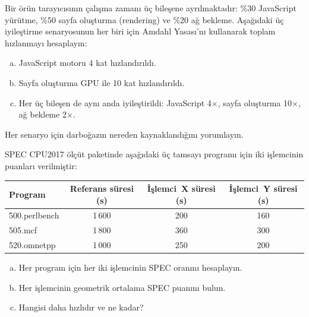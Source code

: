 \begin{alistirma}[\orta]
Bir örün tarayıcısının çalışma zamanı üç bileşene ayrılmaktadır: \%30 JavaScript yürütme, \%50 sayfa oluşturma (rendering) ve \%20 ağ bekleme. Aşağıdaki üç iyileştirme senaryosunun her biri için Amdahl Yasası'nı kullanarak toplam hızlanmayı hesaplayın:
\begin{enumerate}[(a)]
    \item JavaScript motoru 4 kat hızlandırıldı.
    \item Sayfa oluşturma GPU ile 10 kat hızlandırıldı.
    \item Her üç bileşen de aynı anda iyileştirildi: JavaScript 4$\times$, sayfa oluşturma 10$\times$, ağ bekleme 2$\times$.
\end{enumerate}
Her senaryo için darboğazın nereden kaynaklandığını yorumlayın.
\end{alistirma}

\begin{alistirma}[\zor]
SPEC CPU2017 ölçüt paketinde aşağıdaki üç tamsayı programı için iki işlemcinin puanları verilmiştir:

\begin{center}
\small
\begin{tabular}{lccc}
\toprule
\textbf{Program} & \textbf{Referans süresi (s)} & \textbf{İşlemci~X süresi (s)} & \textbf{İşlemci~Y süresi (s)} \\
\midrule
500.perlbench & 1\,600 & 200 & 160 \\
505.mcf       & 1\,800 & 360 & 300 \\
520.omnetpp   & 1\,000 & 250 & 200 \\
\bottomrule
\end{tabular}
\end{center}

\begin{enumerate}[(a)]
    \item Her program için her iki işlemcinin SPEC oranını hesaplayın.
    \item Her işlemcinin geometrik ortalama SPEC puanını bulun.
    \item Hangisi daha hızlıdır ve ne kadar?
\end{enumerate}
\end{alistirma}


